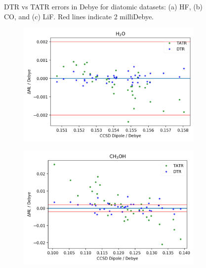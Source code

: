 \begin{figure}
\begin{subfigure}{.5\textwidth}
        \caption{}
        \label{fig:LiF}
    \end{subfigure}
    \caption{DTR vs TATR errors in Debye for diatomic datasets: (a) HF, (b) CO, and (c) LiF. Red lines indicate 2 milliDebye.}
    \label{fig:diatomics-D}
\end{figure}

\begin{figure}
     \begin{subfigure}{.5\textwidth}
         \centering
         \includegraphics[scale=.55]{p2/figures/si/h2o_d.png}
         \caption{}
         \label{fig:H2O_D}
     \end{subfigure}%
     \begin{subfigure}{.5\textwidth}
         \centering
         \includegraphics[scale=.55]{p2/figures/si/ch3oh_d.png}
         \caption{}
         \label{fig:CH3OH_D}
     \end{subfigure}

\end{figure}

